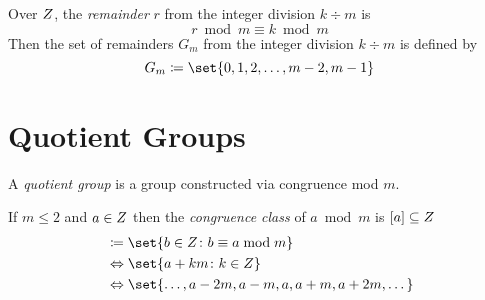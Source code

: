 \begin{definition}
    Over $\relax{Z}$, the \textit{remainder} $r$ from the integer division $k \div m$ is \begin{equation}
        r \bmod m \equiv k \bmod m
    \end{equation}
    Then the set of remainders $G_m$ from the integer division $k \div m$ is defined by
    \begin{equation}
        G_m \coloneqq \set{0, 1, 2, \dots, m - 2, m - 1}
    \end{equation}
\end{definition}

\section{Quotient Groups}
\begin{definition}
    A \textit{quotient group} is a group constructed via congruence mod $m$.
\end{definition}

\begin{definition}
    If $m \le 2$ and $a \in \relax{Z}$ then the \textit{congruence class} of $a \bmod m$ is $[a] \subseteq \relax{Z}$
    \begin{align}
        [a] &\coloneqq \set{b \in \Int \colon b \equiv a \bmod m} \\
        & \Leftrightarrow \set{a + km \colon k \in \Int} \\
        & \Leftrightarrow \set{\dots, a - 2m, a - m, a, a + m, a + 2m, \dots}
    \end{align}
\end{definition}

